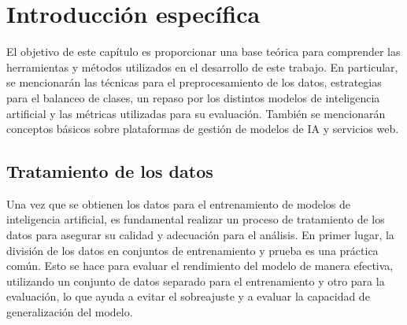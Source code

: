 \chapter{Introducción específica} %

\label{Chapter2}

El objetivo de este capítulo es proporcionar una base teórica para comprender las herramientas y métodos utilizados en el desarrollo de este trabajo. En particular, se mencionarán las técnicas para el preprocesamiento de los datos, estrategias para el balanceo de clases, un repaso por los distintos modelos de inteligencia artificial y las métricas utilizadas para su evaluación. También se mencionarán conceptos básicos sobre plataformas de gestión de modelos de IA y servicios web.

\section{Tratamiento de los datos}

Una vez que se obtienen los datos para el entrenamiento de modelos de inteligencia artificial, es fundamental realizar un proceso de tratamiento de los datos para asegurar su calidad y adecuación para el análisis.
En primer lugar, la división de los datos en conjuntos de entrenamiento y prueba es una práctica común. Esto se hace para evaluar el rendimiento del modelo de manera efectiva, utilizando un conjunto de datos separado para el entrenamiento y otro para la evaluación, lo que ayuda a evitar el sobreajuste y a evaluar la capacidad de generalización del modelo.

